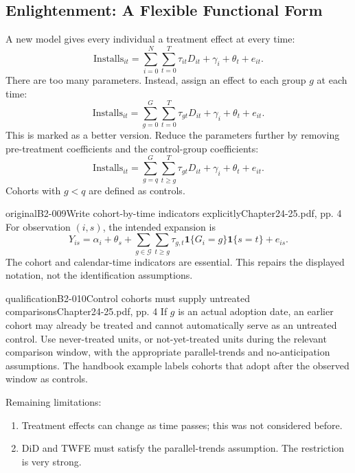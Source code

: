 \subsection{Enlightenment: A Flexible Functional Form}
A new model gives every individual a treatment effect at every time:
\[
\mathrm{Installs}_{it}
 =\sum_{i=0}^{N}\sum_{t=0}^{T}\tau_{it}D_{it}+\gamma_i+\theta_t+e_{it}.
\]
There are too many parameters. Instead, assign an effect to each group \(g\) at each time:
\[
\mathrm{Installs}_{it}
 =\sum_{g=0}^{G}\sum_{t=0}^{T}\tau_{gt}D_{it}+\gamma_i+\theta_t+e_{it}.
\]
This is marked as a better version. Reduce the parameters further by removing pre-treatment coefficients and the control-group coefficients:
\[
\mathrm{Installs}_{it}
 =\sum_{g=q}^{G}\sum_{t\geq g}^{T}\tau_{gt}D_{it}+\gamma_i+\theta_t+e_{it}.
\]
Cohorts with \(g<q\) are defined as controls.
\begin{reviewnote}{original}{B2-009}{Write cohort-by-time indicators explicitly}{Chapter24-25.pdf, pp. 4}
For observation \((i,s)\), the intended expansion is
\[
Y_{is}=\alpha_i+\theta_s+
\sum_{g\in\mathcal G}\sum_{t\geq g}\tau_{g,t}
\mathbf1\{G_i=g\}\mathbf1\{s=t\}+e_{is}.
\]
The cohort and calendar-time indicators are essential. This repairs the displayed notation, not the identification assumptions.
\par{}
\end{reviewnote}
\begin{reviewnote}{qualification}{B2-010}{Control cohorts must supply untreated comparisons}{Chapter24-25.pdf, pp. 4}
If \(g\) is an actual adoption date, an earlier cohort may already be treated and cannot automatically serve as an untreated control. Use never-treated units, or not-yet-treated units during the relevant comparison window, with the appropriate parallel-trends and no-anticipation assumptions. The handbook example labels cohorts that adopt after the observed window as controls.
\par{}
\end{reviewnote}

Remaining limitations:
\begin{enumerate}
\item Treatment effects can change as time passes; this was not considered before.
\item DiD and TWFE must satisfy the parallel-trends assumption. The restriction is very strong.
\end{enumerate}

